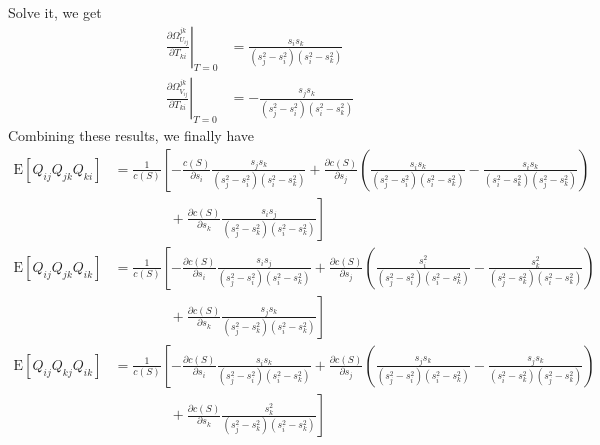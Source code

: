 \documentclass[10pt]{article}
\newcommand{\expect}[1]{\ensuremath{\mathrm{E}\left[ #1 \right]}}
\begin{document}
Solve it, we get
\begin{align}
	\left. \frac{\partial \Omega_{U_{ij}}^{jk}}{\partial T_{ki}} \right|_{T=0} &= \frac{s_is_k}{(s_j^2-s_i^2)(s_i^2-s_k^2)} \nonumber \\
	\left. \frac{\partial \Omega_{V_{ij}}^{jk}}{\partial T_{ki}} \right|_{T=0} &=
	-\frac{s_js_k}{(s_j^2-s_i^2)(s_i^2-s_k^2)}
\end{align}
Combining these results, we finally have
\begin{align}
	\expect{Q_{ij}Q_{jk}Q_{ki}} &= \frac{1}{c(S)}\left[ -\frac{c(S)}{\partial s_i} \frac{s_js_k}{(s_j^2-s_i^2)(s_i^2-s_k^2)} + \frac{\partial c(S)}{\partial s_j} \left( \frac{s_is_k}{(s_j^2-s_i^2)(s_i^2-s_k^2)} - \frac{s_is_k}{(s_i^2-s_k^2)(s_j^2-s_k^2)} \right) \right. \nonumber \\ &\qquad\qquad +\left. \frac{\partial c(S)}{\partial s_k} \frac{s_is_j}{(s_j^2-s_k^2)(s_i^2-s_k^2)} \right] \nonumber \\
	\expect{Q_{ij}Q_{jk}Q_{ik}} &= \frac{1}{c(S)}\left[ -\frac{\partial c(S)}{\partial s_i} \frac{s_is_j}{(s_j^2-s_i^2)(s_i^2-s_k^2)} + \frac{\partial c(S)}{\partial s_j} \left( \frac{s_i^2}{(s_j^2-s_i^2)(s_i^2-s_k^2)} -\frac{s_k^2}{(s_j^2-s_k^2)(s_i^2-s_k^2)} \right) \right. \nonumber \\ &\qquad\qquad +\left. \frac{\partial c(S)}{\partial s_k} \frac{s_js_k}{(s_j^2-s_k^2)(s_i^2-s_k^2)} \right] \nonumber \\
	\expect{Q_{ij}Q_{kj}Q_{ik}} &= \frac{1}{c(S)}\left[ -\frac{\partial c(S)}{\partial s_i} \frac{s_is_k}{(s_j^2-s_i^2)(s_i^2-s_k^2)} + \frac{\partial c(S)}{\partial s_j} \left(\frac{s_js_k}{(s_j^2-s_i^2)(s_i^2-s_k^2)} - \frac{s_js_k}{(s_i^2-s_k^2)(s_j^2-s_k^2)} \right) \right. \nonumber \\ &\qquad\qquad +\left. \frac{\partial c(S)}{\partial s_k} \frac{s_k^2}{(s_j^2-s_k^2)(s_i^2-s_k^2)} \right]
\end{align}
\end{document}

